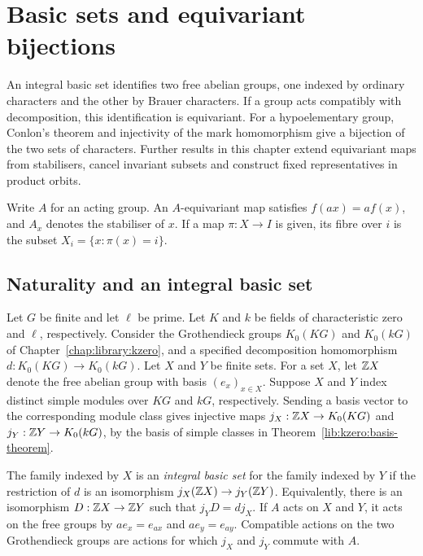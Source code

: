 \chapter{Basic sets and equivariant bijections}
\label{chap:library:assembly}

An integral basic set identifies two free abelian groups, one indexed
by ordinary characters and the other by Brauer characters. If a group
acts compatibly with decomposition, this identification is equivariant.
For a hypoelementary group, Conlon's theorem and injectivity of the mark homomorphism
give a bijection of the two sets of characters. Further results
in this chapter extend equivariant maps from stabilisers, cancel
invariant subsets and construct fixed representatives in product orbits.

Write $A$ for an acting group. An $A$-equivariant map satisfies
$f(ax)=af(x)$, and $A_x$ denotes the stabiliser of $x$. If a map $\pi:X\to I$
is given, its fibre over $i$ is the subset $X_i=\{x:\pi(x)=i\}$.

\section{Naturality and an integral basic set}

Let $G$ be finite and let $\ell$ be prime. Let $K$ and $k$ be fields
of characteristic zero and $\ell$, respectively. Consider the Grothendieck groups
$K_0(KG)$ and $K_0(kG)$ of Chapter~\ref{chap:library:kzero}, and a specified
decomposition homomorphism $d:K_0(KG)\to K_0(kG)$. Let $X$ and $Y$
be finite sets. For a set $X$, let
$\mathbb Z X$ denote the free abelian group with basis $(e_x)_{x\in X}$.
Suppose $X$ and $Y$ index distinct simple modules over $KG$ and $kG$,
respectively. Sending a basis vector to the corresponding module class
gives injective maps $j_X:\mathbb Z X\to K_0(KG)$ and
$j_Y:\mathbb Z Y\to K_0(kG)$, by the basis of simple classes in
Theorem~\ref{lib:kzero:basis-theorem}.

\begin{definition}
The family indexed by $X$ is an \emph{integral basic set} for the family
indexed by $Y$ if the restriction of $d$ is an isomorphism
$j_X(\mathbb Z X)\to j_Y(\mathbb Z Y)$. Equivalently, there is an isomorphism
$D:\mathbb Z X\to\mathbb Z Y$ such that $j_YD=dj_X$.
If $A$ acts on $X$ and $Y$,
it acts on the free groups by $a e_x=e_{ax}$ and $a e_y=e_{ay}$.
Compatible actions on the two Grothendieck groups are actions for which
$j_X$ and $j_Y$ commute with $A$.
\end{definition}

